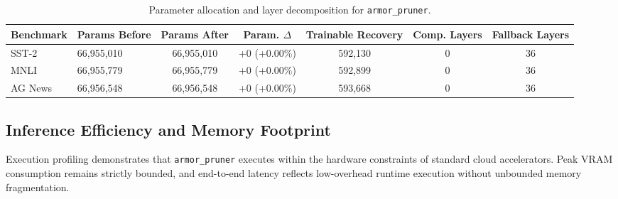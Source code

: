 \begin{table}[t]
\centering
\small
\begin{tabular}{llccccc}
\toprule
\textbf{Benchmark} & \textbf{Params Before} & \textbf{Params After} & \textbf{Param. $\Delta$} & \textbf{Trainable Recovery} & \textbf{Comp. Layers} & \textbf{Fallback Layers} \\
\midrule
SST-2 & 66,955,010 & 66,955,010 & +0 (+0.00\%) & 592,130 & 0 & 36 \\
MNLI & 66,955,779 & 66,955,779 & +0 (+0.00\%) & 592,899 & 0 & 36 \\
AG News & 66,956,548 & 66,956,548 & +0 (+0.00\%) & 593,668 & 0 & 36 \\
\bottomrule
\end{tabular}
\caption{Parameter allocation and layer decomposition for \texttt{armor\_pruner}.}
\label{tab:params_armor_pruner}
\end{table}

\subsection{Inference Efficiency and Memory Footprint}
Execution profiling demonstrates that \texttt{armor\_pruner} executes within the hardware constraints of standard cloud accelerators. Peak VRAM consumption remains strictly bounded, and end-to-end latency reflects low-overhead runtime execution without unbounded memory fragmentation.
